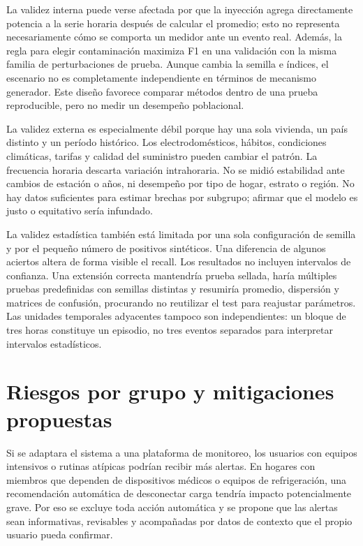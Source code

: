 \documentclass[10pt,twocolumn]{article}
\begin{document}
La validez interna puede verse afectada por que la inyección agrega directamente potencia a la serie horaria después de calcular el promedio; esto no representa necesariamente cómo se comporta un medidor ante un evento real. Además, la regla para elegir contaminación maximiza F1 en una validación con la misma familia de perturbaciones de prueba. Aunque cambia la semilla e índices, el escenario no es completamente independiente en términos de mecanismo generador. Este diseño favorece comparar métodos dentro de una prueba reproducible, pero no medir un desempeño poblacional.

La validez externa es especialmente débil porque hay una sola vivienda, un país distinto y un período histórico. Los electrodomésticos, hábitos, condiciones climáticas, tarifas y calidad del suministro pueden cambiar el patrón. La frecuencia horaria descarta variación intrahoraria. No se midió estabilidad ante cambios de estación o años, ni desempeño por tipo de hogar, estrato o región. No hay datos suficientes para estimar brechas por subgrupo; afirmar que el modelo es justo o equitativo sería infundado.

La validez estadística también está limitada por una sola configuración de semilla y por el pequeño número de positivos sintéticos. Una diferencia de algunos aciertos altera de forma visible el recall. Los resultados no incluyen intervalos de confianza. Una extensión correcta mantendría prueba sellada, haría múltiples pruebas predefinidas con semillas distintas y resumiría promedio, dispersión y matrices de confusión, procurando no reutilizar el test para reajustar parámetros. Las unidades temporales adyacentes tampoco son independientes: un bloque de tres horas constituye un episodio, no tres eventos separados para interpretar intervalos estadísticos.

\section{Riesgos por grupo y mitigaciones propuestas}
Si se adaptara el sistema a una plataforma de monitoreo, los usuarios con equipos intensivos o rutinas atípicas podrían recibir más alertas. En hogares con miembros que dependen de dispositivos médicos o equipos de refrigeración, una recomendación automática de desconectar carga tendría impacto potencialmente grave. Por eso se excluye toda acción automática y se propone que las alertas sean informativas, revisables y acompañadas por datos de contexto que el propio usuario pueda confirmar.
\end{document}
